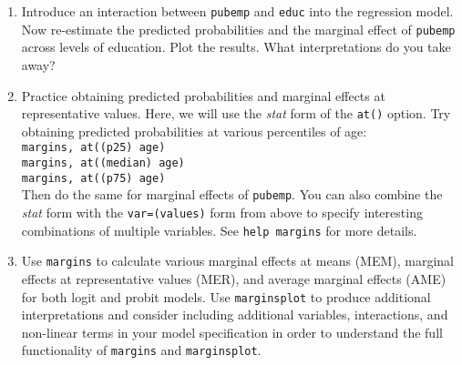 \documentclass[a4paper,12pt]{article}
\begin{document}
\begin{enumerate}
\item Introduce an interaction between \texttt{pubemp} and \texttt{educ} into the regression model. Now re-estimate the predicted probabilities and the marginal effect of \texttt{pubemp} across levels of education. Plot the results. What interpretations do you take away?

\item Practice obtaining predicted probabilities and marginal effects at representative values. Here, we will use the \textit{stat} form of the \texttt{at()} option. Try obtaining predicted probabilities at various percentiles of age:\\
\texttt{margins, at((p25) age)}\\
\texttt{margins, at((median) age)}\\
\texttt{margins, at((p75) age)}\\
Then do the same for marginal effects of \texttt{pubemp}. You can also combine the \textit{stat} form with the \texttt{var=(values)} form from above to specify interesting combinations of multiple variables. See \texttt{help margins} for more details.

\item Use \texttt{margins} to calculate various marginal effects at means (MEM), marginal effects at representative values (MER), and average marginal effects (AME) for both logit and probit models. Use \texttt{marginsplot} to produce additional interpretations and consider including additional variables, interactions, and non-linear terms in your model specification in order to understand the full functionality of \texttt{margins} and \texttt{marginsplot}.


\end{enumerate}
\end{document}
